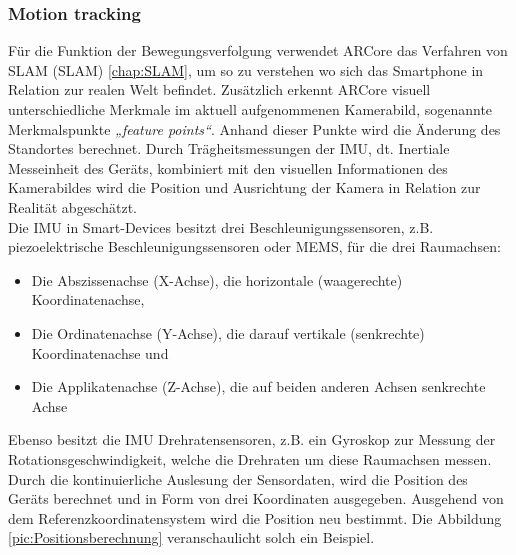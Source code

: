 \subsubsection*{Motion tracking}
Für die Funktion der Bewegungsverfolgung verwendet ARCore das Verfahren von \acl{SLAM} (\acs{SLAM}) \ref{chap:SLAM}, um so zu verstehen wo 
sich das Smartphone in Relation zur realen Welt befindet. Zusätzlich erkennt ARCore visuell unterschiedliche Merkmale im aktuell aufgenommenen 
Kamerabild, sogenannte Merkmalspunkte \textit{„feature points“}. Anhand dieser Punkte wird die Änderung des Standortes berechnet. Durch Trägheitsmessungen 
der \ac{IMU}, dt. Inertiale Messeinheit des Geräts, kombiniert mit den visuellen Informationen des Kamerabildes wird die Position und 
Ausrichtung der Kamera in Relation zur Realität abgeschätzt. \cite{arcoreofficial.2020j}
\\
\linebreak 
Die \acl{IMU} in Smart-Devices besitzt drei Beschleunigungssensoren, z.B. piezoelektrische Beschleunigungssensoren oder \ac{MEMS}, für die 
drei Raumachsen:
\begin{itemize}
    \item Die Abszissenachse (X-Achse), die horizontale (waagerechte) Koordinatenachse,
    \item Die Ordinatenachse (Y-Achse), die darauf vertikale (senkrechte) Koordinatenachse und
    \item Die Applikatenachse (Z-Achse), die auf beiden anderen Achsen senkrechte Achse \cite{koordinatennorm.1973m}
\end{itemize}
Ebenso besitzt die \acs{IMU} Drehratensensoren, z.B. ein Gyroskop zur Messung der Rotationsgeschwindigkeit, welche die Drehraten um 
diese Raumachsen messen. Durch die kontinuierliche Auslesung der Sensordaten, wird die Position des Geräts berechnet und in Form von 
drei Koordinaten ausgegeben. Ausgehend von dem Referenzkoordinatensystem wird die Position neu bestimmt. Die Abbildung \ref{pic:Positionsberechnung} 
veranschaulicht solch ein Beispiel.
